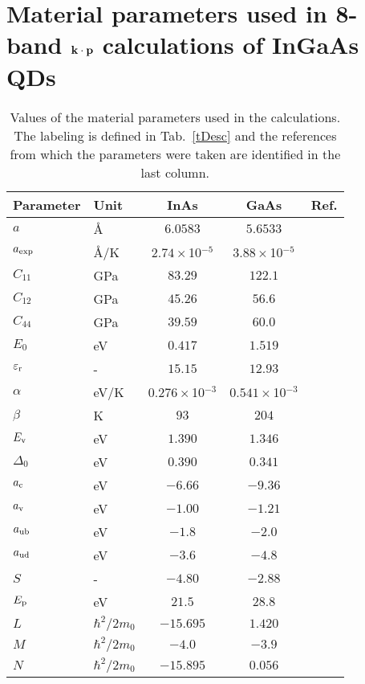 \chapter{Material parameters used in 8-band $\bf{k \cdot p}$ calculations of InGaAs QDs} \label{app:material_params}

\begin{table*}[!ht]
	\caption{Values of the material parameters used in the calculations. The labeling is defined in Tab.~\ref{tDesc} and the references from which the parameters were taken are identified in the last column.\label{tSb2} 
		}
	\begin{center}
		\begin{tabular}{llccc}
			\hline \hline
			Parameter & Unit & InAs & GaAs & Ref.\\
			\hline
			$a$ & \AA & $6.0583$ & $5.6533$  & \cite{Vurgaftman}\\
			$a_{\rm exp}$ & \AA /K& $2.74\times$10$^{-5}$ & $3.88\times$10$^{-5}$  & \cite{Vurgaftman}\\
			$C_{11}$ & GPa& $83.29$ & $122.1$  & \cite{Vurgaftman}\\
			$C_{12}$ & GPa& $45.26$ & $56.6$  & \cite{Vurgaftman}\\
			$C_{44}$ & GPa& $39.59$ & $60.0$ & \cite{Vurgaftman}\\
			$E_0$ & eV & $0.417$ & $1.519$ &  \cite{Vurgaftman}\\
			$\varepsilon_{\rm r}$ & -& $15.15$ & $12.93$ &\cite{landoltbornstein}\\
			$\alpha$ & eV/K & $0.276\times$10$^{-3}$ & $0.541\times$10$^{-3}$ &  \cite{Vurgaftman}\\
			$\beta$ & K & $93$ & $204$ & \cite{Vurgaftman}\\
			$E_{\rm v}$ & eV & $1.390$ & $1.346$ &  \cite{zunger}\\
			$\Delta_0$ & eV & $0.390$ & $0.341$ &  \cite{Vurgaftman}\\
			$a_{\rm c}$ & eV & $-6.66$ & $-9.36$ & \cite{zunger}\\
			$a_{\rm v}$ & eV & $-1.00$ & $-1.21$ & \cite{zunger}\\
			$a_{\rm ub}$ & eV & $-1.8$& $-2.0$&  \cite{Vurgaftman}\\
			$a_{\rm ud}$ & eV & $-3.6$& $-4.8$&  \cite{Vurgaftman}\\
			$S$ & -& $-4.80$ & $-2.88$ & \cite{Vurgaftman}\\
			$E_{\rm p}$ & eV & $21.5$ & $28.8$ & \cite{Vurgaftman}\\
			$L$ & $\hbar^2/2m_0$ & $-15.695$ & $1.420$ & \cite{Vurgaftman}\\
			$M$ & $\hbar^2/2m_0$ & $-4.0$ & $-3.9$ & \cite{Vurgaftman}\\
			$N$ & $\hbar^2/2m_0$ & $-15.895$ & $0.056$ & \cite{Vurgaftman}\\
			\hline \hline
		\end{tabular}
	\end{center}
\end{table*}

